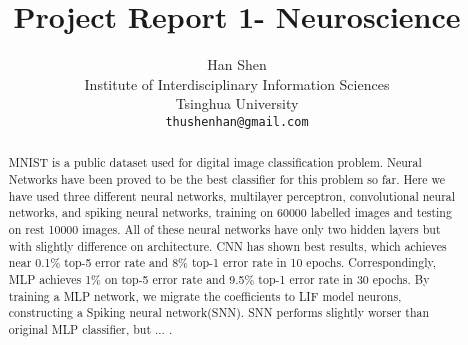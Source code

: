 \documentclass[10pt,twocolumn,letterpaper]{article}
\begin{document}
\title{Project Report 1- Neuroscience}

\author{Han Shen\\
Institute of Interdisciplinary Information Sciences\\
Tsinghua University\\
{\tt\small thushenhan@gmail.com}
}

\maketitle

\begin{abstract}
MNIST is a public dataset used for digital image classification problem. Neural Networks have been proved to be the best classifier for this problem so far. Here we have used three different neural networks, multilayer perceptron, convolutional neural networks, and spiking neural networks, training on 60000 labelled images and testing on rest 10000 images. All of these neural networks have only two hidden layers but with slightly difference on architecture.  CNN has shown best results, which achieves near 0.1\% top-5 error rate and 8\% top-1 error rate in 10 epochs. Correspondingly, MLP achieves 1\% on top-5 error rate and  9.5\% top-1 error rate in 30 epochs. By training a MLP network, we migrate the coefficients to LIF model neurons, constructing a Spiking neural network(SNN). SNN performs slightly worser than original MLP classifier, but ... .
\end{abstract}

\end{document}
